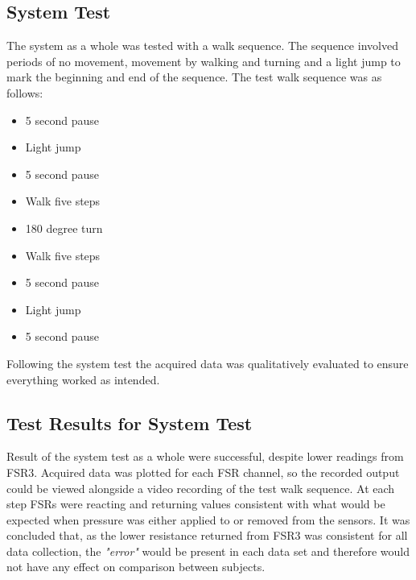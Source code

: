 \subsection{System Test}
The system as a whole was tested with a walk sequence. The sequence involved periods of no movement, movement by walking and turning and a light jump to mark the beginning and end of the sequence. The test walk sequence was as follows:
\vspace{-0.6cm}
\begin{itemize}
	\item 5 second pause
	\vspace{-0.3cm}
	\item Light jump
	\vspace{-0.3cm}
	\item 5 second pause
	\vspace{-0.3cm}
	\item Walk five steps
	\vspace{-0.3cm}
	\item 180 degree turn
	\vspace{-0.3cm}
	\item Walk five steps
	\vspace{-0.3cm}
	\item 5 second pause
	\vspace{-0.3cm}
	\item Light jump
	\vspace{-0.3cm}
	\item 5 second pause
\end{itemize}
\vspace{-0.4cm}
Following the system test the acquired data was qualitatively evaluated to ensure everything worked as intended. 

\subsection{Test Results for System Test}
Result of the system test as a whole were successful, despite lower readings from FSR3. Acquired data was plotted for each FSR channel, so the recorded output could be viewed alongside a video recording of the test walk sequence. At each step FSRs were reacting and returning values consistent with what would be expected when pressure was either applied to or removed from the sensors. 
It was concluded that, as the lower resistance returned from FSR3 was consistent for all data collection, the \textit{"error"} would be present in each data set and therefore would not have any effect on comparison between subjects. 


